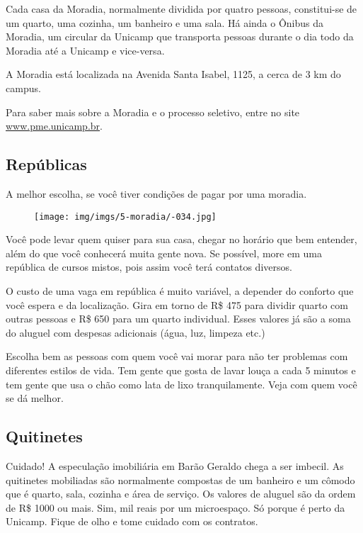 Cada casa da Moradia, normalmente dividida por quatro pessoas, constitui-se de
um quarto, uma cozinha, um banheiro e uma sala. Há ainda o Ônibus da Moradia, um
circular da Unicamp que transporta pessoas durante o dia todo da Moradia até a
Unicamp e vice-versa.

A Moradia está localizada na Avenida Santa Isabel, 1125, a cerca de 3 km do
campus.

Para saber mais sobre a Moradia e o processo seletivo, entre no site
\url{www.pme.unicamp.br}.

\subsection{Repúblicas}

A melhor escolha, se você tiver condições de pagar por uma moradia.

\begin{figure}[h!]
    \vspace{-10pt}
    \centering
    \texttt{[image: img/imgs/5-moradia/-034.jpg]}
    \vspace{-10pt}
\end{figure}

Você pode levar quem quiser para sua casa, chegar no horário que bem entender,
além do que você conhecerá muita gente nova. Se possível, more em uma república
de cursos mistos, pois assim você terá contatos diversos.

O custo de uma vaga em república é muito variável, a depender do conforto que
você espera e da localização. Gira em torno de R\$ 475 para dividir quarto com
outras pessoas e R\$ 650 para um quarto individual. Esses valores já são a soma
do aluguel com despesas adicionais (água, luz, limpeza etc.)

Escolha bem as pessoas com quem você vai morar para não ter problemas com
diferentes estilos de vida. Tem gente que gosta de lavar louça a cada 5 minutos
e tem gente que usa o chão como lata de lixo tranquilamente. Veja com quem você
se dá melhor.

\subsection{Quitinetes}

Cuidado! A especulação imobiliária em Barão Geraldo chega a ser imbecil. As
quitinetes mobiliadas são normalmente compostas de um banheiro e um cômodo que é
quarto, sala, cozinha e área de serviço. Os valores de aluguel são da ordem de
R\$ 1000 ou mais. Sim, mil reais por um microespaço. Só porque é perto da
Unicamp. Fique de olho e tome cuidado com os contratos.

